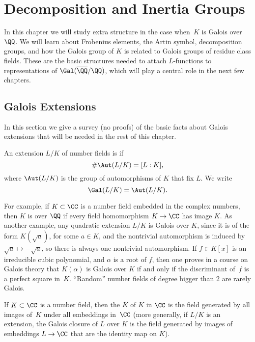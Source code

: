 
\chapter{Decomposition and Inertia Groups}

In this chapter we will study extra structure in the case when~$K$
is Galois over~$\QQ$. We will learn about Frobenius elements,
the Artin symbol, decomposition groups, and how the Galois group of
$K$ is related to Galois groups of residue class fields. These are
the basic structures needed to attach $L$-functions to representations of
$\Gal(\overline{\QQ}/\QQ)$, which will play a central role in the next few chapters.

\section{Galois Extensions}

In this section we give a survey (no proofs) of the basic facts about
Galois extensions that will be needed in the rest of this chapter.
\begin{definition}[Galois]
  An extension $L/K$ of number fields is  if
  \[
    \#\Aut(L/K) = [L:K],
  \]
  where $\Aut(L/K)$ is the group of automorphisms of $K$
  that fix $L$.  We write
  \[
    \Gal(L/K) = \Aut(L/K).
  \]
\end{definition}
For example, if $K \subset \CC$ is a number field embedded in the complex numbers,
then $K$ is  over $\QQ$ if every field
homomorphism $K \to \CC$ has image $K$. As another example, any quadratic
extension $L/K$ is Galois over $K$, since it is of the form $K(\sqrt{a})$,
for some $a \in K$, and the nontrivial automorphism is induced
by $\sqrt{a} \mapsto -\sqrt{a}$, so there is always one nontrivial automorphism.
If $f \in K[x]$ is an irreducible cubic polynomial, and $\alpha$ is
a root of $f$, then one proves in a course on Galois theory that $K(\alpha)$
is Galois over $K$ if and only if the discriminant of~$f$ is a perfect square
in~$K$. ``Random'' number fields of degree bigger than $2$ are rarely Galois.

If $K \subset \CC$ is a number field, then the  $\overline{K}$
of $K$ in $\CC$ is the field generated by all images of~$K$ under all
embeddings in~$\CC$ (more generally, if $L/K$ is an extension, the
Galois closure of $L$ over $K$ is the field generated by images of
embeddings $L \to \CC$ that are the identity map on $K$).

